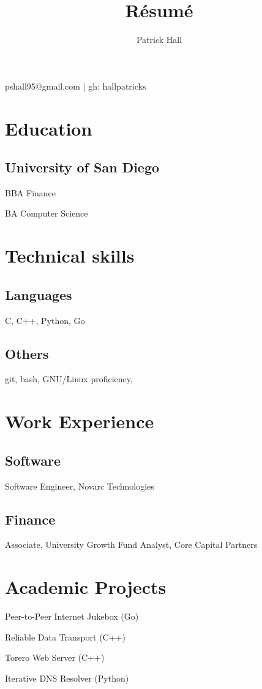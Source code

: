 \documentclass{article}
\makeatletter
\renewcommand{\maketitle}{
\begin{center}
{\huge\bfseries
\theauthor}

pshall95@gmail.com | gh: hallpatricks

\end{center}
}
\makeatother
\begin{document}
\title{R\'esum\'e}
\author{Patrick Hall}

\maketitle

\section{Education}
\subsection{University of San Diego}
BBA Finance

BA Computer Science

\section{Technical skills}
\subsection{Languages}
C, C++, Python, Go

\subsection{Others}
git, bash, GNU/Linux proficiency, 

\section{Work Experience}
\subsection{Software}
Software Engineer, Novarc Technologies

\subsection{Finance}
Associate, University Growth Fund
Analyst, Core Capital Partners

\section{Academic Projects}
Peer-to-Peer Internet Jukebox (Go)

Reliable Data Transport (C++)

Torero Web Server (C++)

Iterative DNS Resolver (Python)
\end{document}
